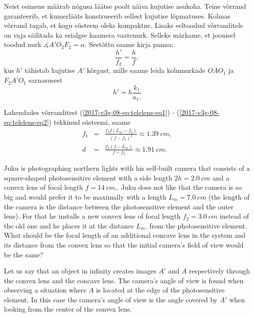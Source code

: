\noindent Neist esimene määrab nõgusa läätse poolt näiva kujutise asukoha.
Teine võrrand garanteerib, et kumerlääts konstrueerib sellest kujutise
lõpmatuses. Kolmas võrrand tagab, et kogu süsteem oleks kompaktne.
Lisaks eeltoodud võrranditele on vaja säilitada ka esialgse kaamera
vaatenurk. Selleks märkame, et joonisel toodud nurk $\measuredangle A'O_{2}F_{2}=\alpha.$
Seetõttu saame kirja panna:
\begin{equation}
\frac{h'}{f_{2}}=\frac{h}{f},
\end{equation}
\noindent kus $h'$ tähistab kujutise $A'$ kõrgust, mille saame leida
kolmnurkade $OAO_{1}$ ja $F_{2}A'O_{1}$ sarnasusest
\begin{equation}
h'=h\frac{k_{1}}{a_{1}.}\label{2017-v3g-08-eq:telelens-eq2}
\end{equation}

Lahendades võrranditest (\ref{2017-v3g-08-eq:telelens-eq1}) - (\ref{2017-v3g-08-eq:telelens-eq2})
tekkinud süsteemi, saame
\begin{eqnarray*}
f_{1} & = & \frac{f_{2}f(L_{m}-f_{2})}{\left(f-f_{2}\right)^{2}}\approx\SI{1.39}{cm},\\
d & = & \frac{f_{2}(f-L_{m})}{f-f_{2}}\approx\SI{1.91}{cm}.
\end{eqnarray*}

Juku is photographing northern lights with his self-built camera that consists of a square-shaped photosensitive element with a side length $2h=\SI{2.0}{cm}$ and a convex lens of focal length $f=\SI{14}{cm}.$. Juku does not like that the camera is so big and would prefer it to be maximally with a length $L_{m}=\SI{7.0}{cm}$ (the length of the camera is the distance between the photosensitive element and the outer lens). For that he installs a new convex lens of focal length $f_{2}=\SI{3.0}{cm}$ instead of the old one and he places it at the distance $L_{m}.$ from the photosensitive element. What should be the focal length of an additional concave lens in the system and its distance from the convex lens so that the initial camera’s field of view would be the same?

\hinteng
Let us say that an object in infinity creates images $A'$ and $A$ respectively through the convex lens and the concave lens. The camera’s angle of view is found when observing a situation where $A$ is located at the edge of the photosensitive element. In this case the camera’s angle of view is the angle covered by $A'$ when looking from the center of the convex lens.

